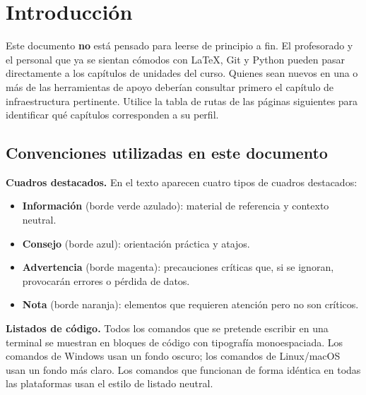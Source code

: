 \chapter{Introducción}

\begin{infobox}
Este documento \textbf{no} está pensado para leerse de principio a fin.
El profesorado y el personal que ya se sientan cómodos con \LaTeX{}, Git y
Python pueden pasar directamente a los capítulos de unidades del curso. Quienes
sean nuevos en una o más de las herramientas de apoyo deberían consultar primero
el capítulo de infraestructura pertinente. Utilice la tabla de rutas de las
páginas siguientes para identificar qué capítulos corresponden a su perfil.
\end{infobox}

\section*{Convenciones utilizadas en este documento}

\noindent
\textbf{Cuadros destacados.} En el texto aparecen cuatro tipos de cuadros destacados:

\begin{itemize}
    \item \textbf{Información} (borde verde azulado): material de referencia y
          contexto neutral.
    \item \textbf{Consejo} (borde azul): orientación práctica y
          atajos.
    \item \textbf{Advertencia} (borde magenta): precauciones críticas
          que, si se ignoran, provocarán errores o pérdida de datos.
    \item \textbf{Nota} (borde naranja): elementos que requieren atención
          pero no son críticos.
\end{itemize}

\noindent
\textbf{Listados de código.} Todos los comandos que se pretende escribir en una
terminal se muestran en bloques de código con tipografía monoespaciada. Los comandos de Windows usan
un fondo oscuro; los comandos de Linux/macOS usan un fondo más claro.
Los comandos que funcionan de forma idéntica en todas las plataformas usan el estilo
de listado neutral.

